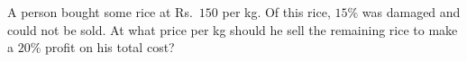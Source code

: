 A person bought some rice at Rs.~$150$ per kg. Of this rice, $15\%$ was damaged and could not be sold. At what price per kg should he sell the remaining rice to make a $20\%$ profit on his total cost?

